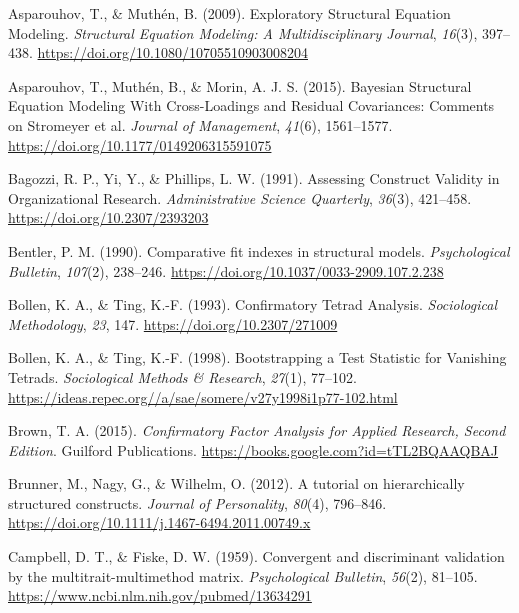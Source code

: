 \documentclass[
  american,
  man,floatsintext]{apa7}
\newlength{\cslhangindent}
\newenvironment{CSLReferences}[2] %
 {\begin{list}{}{%
  \setlength{\itemindent}{0pt}
  \setlength{\leftmargin}{0pt}
  \setlength{\parsep}{0pt}
  \ifodd #1
   \setlength{\leftmargin}{\cslhangindent}
   \setlength{\itemindent}{-1\cslhangindent}
  \fi
  \setlength{\itemsep}{#2\baselineskip}}}
 {\end{list}}
\begin{document}
\protect{}\label{refs}
\begin{CSLReferences}{1}{0}
Asparouhov, T., \& Muthén, B. (2009). Exploratory {Structural Equation Modeling}. \emph{Structural Equation Modeling: A Multidisciplinary Journal}, \emph{16}(3), 397--438. \url{https://doi.org/10.1080/10705510903008204}

Asparouhov, T., Muthén, B., \& Morin, A. J. S. (2015). Bayesian {Structural Equation Modeling With Cross-Loadings} and {Residual Covariances}: {Comments} on {Stromeyer} et al. \emph{Journal of Management}, \emph{41}(6), 1561--1577. \url{https://doi.org/10.1177/0149206315591075}

Bagozzi, R. P., Yi, Y., \& Phillips, L. W. (1991). Assessing {Construct Validity} in {Organizational Research}. \emph{Administrative Science Quarterly}, \emph{36}(3), 421--458. \url{https://doi.org/10.2307/2393203}

Bentler, P. M. (1990). Comparative fit indexes in structural models. \emph{Psychological Bulletin}, \emph{107}(2), 238--246. \url{https://doi.org/10.1037/0033-2909.107.2.238}

Bollen, K. A., \& Ting, K.-F. (1993). Confirmatory {Tetrad Analysis}. \emph{Sociological Methodology}, \emph{23}, 147. \url{https://doi.org/10.2307/271009}

Bollen, K. A., \& Ting, K.-F. (1998). Bootstrapping a {Test Statistic} for {Vanishing Tetrads}. \emph{Sociological Methods \& Research}, \emph{27}(1), 77--102. \url{https://ideas.repec.org//a/sae/somere/v27y1998i1p77-102.html}

Brown, T. A. (2015). \emph{Confirmatory {Factor Analysis} for {Applied Research}, {Second Edition}}. Guilford Publications. \url{https://books.google.com?id=tTL2BQAAQBAJ}

Brunner, M., Nagy, G., \& Wilhelm, O. (2012). A tutorial on hierarchically structured constructs. \emph{Journal of Personality}, \emph{80}(4), 796--846. \url{https://doi.org/10.1111/j.1467-6494.2011.00749.x}

Campbell, D. T., \& Fiske, D. W. (1959). Convergent and discriminant validation by the multitrait-multimethod matrix. \emph{Psychological Bulletin}, \emph{56}(2), 81--105. \url{https://www.ncbi.nlm.nih.gov/pubmed/13634291}


\end{CSLReferences}
\end{document}
